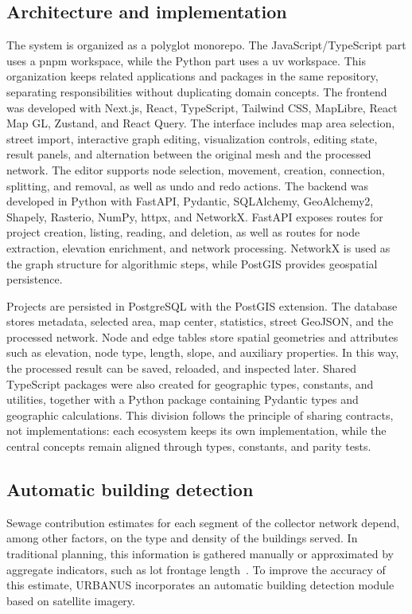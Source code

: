 \subsection{Architecture and implementation}

The system is organized as a polyglot monorepo.
The JavaScript/TypeScript part uses a pnpm workspace, while the Python part uses a uv workspace.
This organization keeps related applications and packages in the same repository, separating responsibilities without duplicating domain concepts.
% 
The frontend was developed with Next.js, React, TypeScript, Tailwind CSS, MapLibre, React Map GL, Zustand, and React Query.
The interface includes map area selection, street import, interactive graph editing, visualization controls, editing state, result panels, and alternation between the original mesh and the processed network.
The editor supports node selection, movement, creation, connection, splitting, and removal, as well as undo and redo actions.
% 
The backend was developed in Python with FastAPI, Pydantic, SQLAlchemy, GeoAlchemy2, Shapely, Rasterio, NumPy, httpx, and NetworkX.
FastAPI exposes routes for project creation, listing, reading, and deletion, as well as routes for node extraction, elevation enrichment, and network processing.
NetworkX is used as the graph structure for algorithmic steps, while PostGIS provides geospatial persistence.

Projects are persisted in PostgreSQL with the PostGIS extension.
The database stores metadata, selected area, map center, statistics, street GeoJSON, and the processed network. Node and edge tables store spatial geometries and attributes such as elevation, node type, length, slope, and auxiliary properties.
In this way, the processed result can be saved, reloaded, and inspected later.
% 
Shared TypeScript packages were also created for geographic types, constants, and utilities, together with a Python package containing Pydantic types and geographic calculations.
This division follows the principle of sharing contracts, not implementations: each ecosystem keeps its own implementation, while the central concepts remain aligned through types, constants, and parity tests.


\subsection{Automatic building detection}

Sewage contribution estimates for each segment of the collector network depend, among other factors, on the type and density of the buildings served.
In traditional planning, this information is gathered manually or approximated by aggregate indicators, such as lot frontage length~\cite{rodrigues2020}.
To improve the accuracy of this estimate, URBANUS incorporates an automatic building detection module based on satellite imagery.

